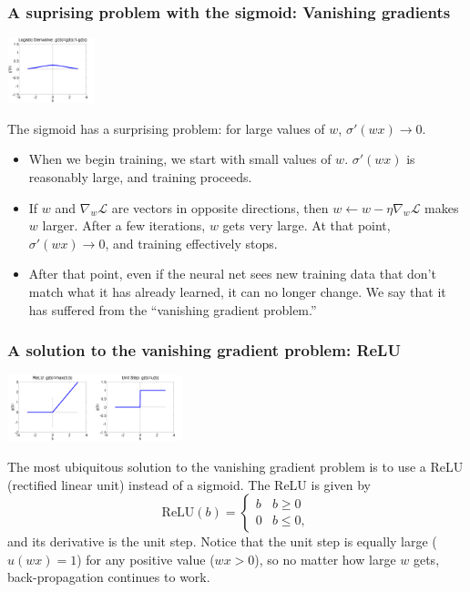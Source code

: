 \documentclass{beamer}
\begin{document}
\begin{frame}
  \frametitle{A suprising problem with the sigmoid: Vanishing gradients}
  \centerline{\includegraphics[width=1in]{figs/nn_logisticprime.png}}
  
  The sigmoid has a surprising problem: for large values of $w$,
  $\sigma'(wx)\rightarrow 0$.
  \begin{itemize}
  \item When we begin training, we start with small values of $w$.
    $\sigma'(wx)$ is reasonably large, and training proceeds.
  \item If $w$ and $\nabla_{w}{\mathcal L}$ are vectors in opposite
    directions, then $w\leftarrow w-\eta\nabla_{w}{\mathcal L}$ makes
    $w$ larger.  After a few iterations, $w$ gets very large.  At that
    point, $\sigma'(wx)\rightarrow 0$, and training effectively stops.
  \item After that point, even if the neural net sees new training
    data that don't match what it has already learned, it can no
    longer change.  We say that it has suffered from the ``vanishing
    gradient problem.''
  \end{itemize}
\end{frame}
    
\begin{frame}
  \frametitle{A solution to the vanishing gradient problem: ReLU}
  \centerline{\includegraphics[width=1in]{figs/nn_relu.png}\includegraphics[width=1in]{figs/nn_unitstep.png}}

  The most ubiquitous solution to the vanishing gradient problem is to
  use a ReLU (rectified linear unit) instead of a sigmoid.  The ReLU
  is given by
  \[
  \mbox{ReLU}(b) = \begin{cases}
    b & b\ge 0\\
    0 & b\le 0,
  \end{cases}
  \]
  and its derivative is the unit step.  Notice that the
  unit step is equally large ($u(wx)=1$)  for any positive value ($wx>0$), so
  no matter how large $w$ gets, back-propagation continues to work.
\end{frame}
\end{document}
